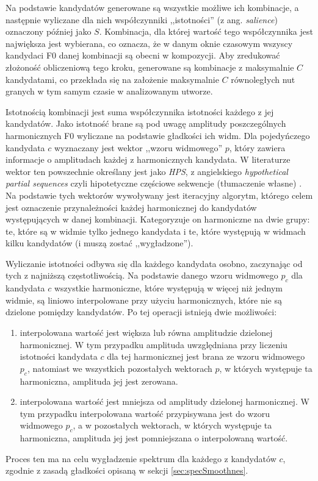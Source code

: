 \documentclass[12pt,a4paper,twoside]{mwart}
\begin{document}
Na podstawie kandydatów generowane są wszystkie możliwe ich kombinacje, a następnie wyliczane dla nich współczynniki ,,istotności'' (z ang. \textit{salience}) oznaczony później jako $S$. Kombinacja, dla której wartość tego współczynnika jest największa jest wybierana, co oznacza, że w danym oknie czasowym wszyscy kandydaci F0 danej kombinacji są obecni w kompozycji. Aby zredukować złożoność obliczeniową tego kroku, generowane są kombinacje z maksymalnie $C$ kandydatami, co przekłada się na założenie maksymalnie $C$ równoległych nut granych w tym samym czasie w analizowanym utworze.

Istotnością kombinacji jest suma współczynnika istotności każdego z jej kandydatów. Jako istotność brane są pod uwagę amplitudy poszczególnych harmonicznych F0 wyliczane na podstawie gładkości ich widm. Dla pojedyńczego kandydata $c$ wyznaczany jest wektor ,,wzoru widmowego'' $p$, który zawiera informacje o amplitudach każdej z harmonicznych kandydata. W literaturze wektor ten powszechnie określany jest jako \textit{HPS}, z angielskiego \textit{hypothetical partial sequences} czyli hipotetyczne częściowe sekwencje (tłumaczenie własne) \cite[3]{Transcription:Yeh:JointEvaluationF0:2}. Na podstawie tych wektorów wywoływany jest iteracyjny algorytm, którego celem jest oznaczenie przynależności każdej harmonicznej do kandydatów występujących w danej kombinacji. Kategoryzuje on harmoniczne na dwie grupy: te, które są w widmie tylko jednego kandydata i te, które występują w widmach kilku kandydatów (i muszą zostać ,,wygładzone'').

Wyliczanie istotności odbywa się dla każdego kandydata osobno, zaczynając od tych z najniższą częstotliwością. Na podstawie danego wzoru widmowego $p_c$ dla kandydata $c$ wszystkie harmoniczne, które występują w więcej niż jednym widmie, są liniowo interpolowane przy użyciu harmonicznych, które nie są dzielone pomiędzy kandydatów. Po tej operacji istnieją dwie możliwości:
\begin{enumerate}
\item interpolowana wartość jest większa lub równa amplitudzie dzielonej harmonicznej. W tym przypadku amplituda uwzględniana przy liczeniu istotności kandydata $c$ dla tej harmonicznej jest brana ze wzoru widmowego $p_c$, natomiast we wszystkich pozostałych wektorach $p$, w których występuje ta harmoniczna, amplituda jej jest zerowana.
\item interpolowana wartość jest mniejsza od amplitudy dzielonej harmonicznej. W tym przypadku interpolowana wartość przypisywana jest do wzoru widmowego $p_c$, a w pozostałych wektorach, w których występuje ta harmoniczna, amplituda jej jest pomniejszana o interpolowaną wartość.
\end{enumerate}
Proces ten ma na celu wygładzenie spektrum dla każdego z kandydatów $c$, zgodnie z zasadą gładkości opisaną w sekcji \ref{sec:specSmoothnes}.
\end{document}
